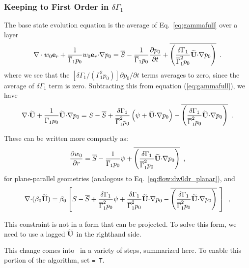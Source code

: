 \subsubsection{Keeping to First Order in $\delta\Gamma_1$}
The base state evolution equation is the average of Eq.~\ref{eq:gammafull} over a layer
\begin{equation}
\mathbf{\nabla} \cdot w_0 \mathbf{e}_r + \frac{1}{\overline{\Gamma}_1 p_0} w_0 \mathbf{e}_r \mathbf{\cdot} \mathbf{\nabla} p_0 =
\overline{S} - \frac{1}{\overline{\Gamma}_1 p_0} \frac{\partial p_0}{\partial t} + \overline{
  \left ( \frac{\delta \Gamma_1}{\overline{\Gamma}_1^2 p_0} \widetilde{{\bf U}} \mathbf{\cdot} \mathbf{\nabla} p_0
  \right ) } \enskip .
\end{equation}
where we see that the $[\delta \Gamma_1/(\Gamma_1^2 p_0)] \partial p_0/\partial t$ terms averages to zero, since the average of $\delta\Gamma_1$ term is zero.
Subtracting this from equation (\ref{eq:gammafull}), we have
\begin{equation}
\mathbf{\nabla} \mathbf{\cdot} \widetilde{{\bf U}} + \frac{1}{\overline{\Gamma}_1 p_0} \widetilde{{\bf U}} \mathbf{\cdot} \mathbf{\nabla} p_0 = S -
\overline{S} + \frac{\delta \Gamma_1}{\overline{\Gamma}_1^2 p_0} \left (\psi + \widetilde{{\bf U}} \mathbf{\cdot}
\mathbf{\nabla} p_0 \right ) - \overline{ \left ( \frac{\delta \Gamma_1}{\overline{\Gamma}_1^2 p_0} \widetilde{{\bf U}}
\mathbf{\cdot} \mathbf{\nabla} p_0 \right ) } \enskip .
\end{equation}

These can be written more compactly as:
\begin{equation}
\frac{\partial w_0}{\partial r} = \overline{S} -\frac{1}{\overline{\Gamma}_1 p_0}\psi +
\overline{ \left ( \frac{\delta \Gamma_1}{\overline{\Gamma}_1^2 p_0} \widetilde{{\bf U}} \mathbf{\cdot} \mathbf{\nabla}
  p_0 \right ) } \enskip , \label{eq:base_w0_with_dgamma1}
\end{equation}
for plane-parallel geometries (analogous to
Eq.~\ref{eq:flow:dw0dr_planar}), and
\begin{equation}
\mathbf{\nabla} \mathbf{\cdot} (\beta_0 \widetilde{{\bf U}}) = \beta_0 \left [ S - \overline{S} + \frac{\delta
    \Gamma_1}{\overline{\Gamma}_1^2 p_0} \psi + \frac{\delta \Gamma_1}{\overline{\Gamma}_1^2 p_0}
  \widetilde{{\bf U}} \mathbf{\cdot} \mathbf{\nabla} p_0 - \overline{ \left ( \frac{\delta
      \Gamma_1}{\overline{\Gamma}_1^2 p_0} \widetilde{{\bf U}} \mathbf{\cdot} \mathbf{\nabla} p_0 \right ) } ~ \right ]
 \enskip ,  \label{eq:constraint_with_delta_gamma}
\end{equation}

This constraint is not in a form that can be projected.  To solve this
form, we need to use a lagged $\widetilde{{\bf U}}$ in the righthand side.

This change comes into \maestroex\ in a variety of steps, summarized here.
To enable this portion of the algorithm, set  {\tt = T}.

